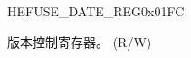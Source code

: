 \begin{register}{H}{EFUSE\_DATE\_REG}{0x01FC}\label{regdesc:EFUSEDATEREG}
%
%
\regnewline%
\begin{regdesc}\begin{reglist}
\label{fielddesc:EFUSEDATE}\item [EFUSE\_DATE] 版本控制寄存器。 (R/W)
\end{reglist}\end{regdesc}
\end{register}
